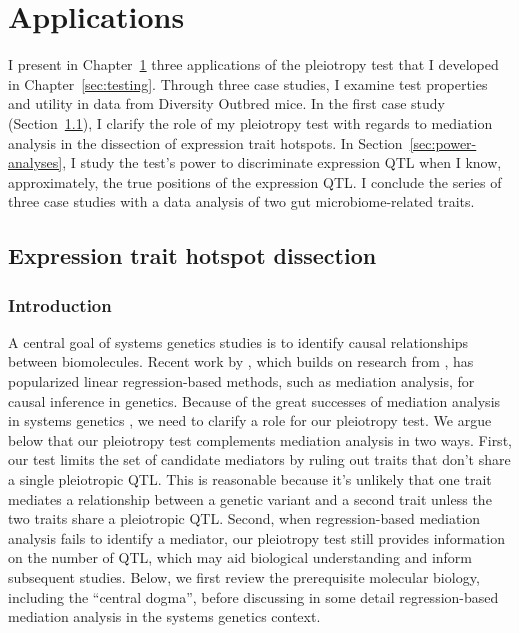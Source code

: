 \documentclass[oneside]{book}\usepackage[]{graphicx}\usepackage[]{color}
\begin{document}
\chapter{Applications}\label{sec:applications}

I present in Chapter~\ref{sec:applications} three applications of the
pleiotropy test that I developed in Chapter~\ref{sec:testing}. Through three case studies, I examine test properties and utility in data from Diversity Outbred mice. In the first case study (Section~\ref{sec:hotspot-dissection}), I clarify the role of my pleiotropy test with regards to mediation analysis in the dissection of expression trait hotspots. In Section~\ref{sec:power-analyses}, I study the test's power to discriminate expression QTL when I know, approximately, the true positions of the expression QTL. I conclude the series of three case studies with a data analysis of two gut microbiome-related traits.


\section{Expression trait hotspot dissection}\label{sec:hotspot-dissection}
\subsection{Introduction}

A central goal of systems genetics studies is to identify causal relationships between biomolecules. 
Recent work by \citet{chick2016defining}, which builds on research from \citet{baron1986moderator}, has popularized linear regression-based methods, such as mediation analysis, for causal inference in genetics. 
Because of the great successes of mediation analysis in systems genetics 
\citep{chick2016defining,keller2018genetic}, we need to clarify a role for our pleiotropy test. 
We argue below that our pleiotropy test complements mediation analysis in two ways. 
First, our test limits the set of candidate mediators by ruling out traits that don't share 
a single pleiotropic QTL. 
This is reasonable because it's unlikely that one trait mediates a relationship between a 
genetic variant and a second trait unless the two traits share a pleiotropic QTL. 
Second, when regression-based mediation analysis fails to identify a mediator, our 
pleiotropy test still provides information on the number of QTL, which may aid biological 
understanding and inform subsequent studies. Below, we first review the prerequisite 
molecular biology, including the ``central dogma'', before discussing in some detail 
regression-based mediation analysis in the systems genetics context. 
\end{document}
